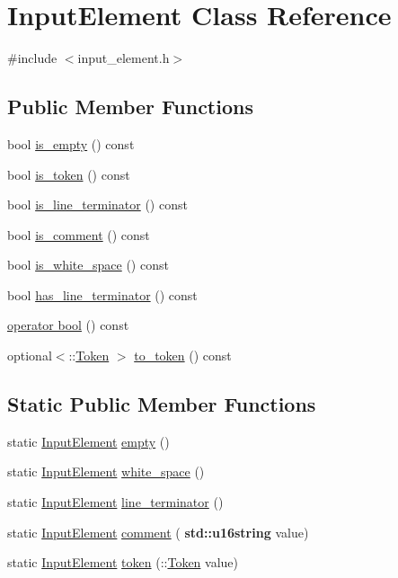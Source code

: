 \hypertarget{class_input_element}{}\section{Input\+Element Class Reference}
\label{class_input_element}


{\ttfamily \#include $<$input\+\_\+element.\+h$>$}

\subsection*{Public Member Functions}
\begin{DoxyCompactItemize}
\item 
bool \hyperlink{class_input_element_a4e4b6b2005fe0b8d07f30ef27210a51b}{is\+\_\+empty} () const
\item 
bool \hyperlink{class_input_element_a6bac1905f5d9aa43f89e1bbfdb553c15}{is\+\_\+token} () const
\item 
bool \hyperlink{class_input_element_adef5e449a8107adaac4f570994d698b9}{is\+\_\+line\+\_\+terminator} () const
\item 
bool \hyperlink{class_input_element_a1e2afc5eda150e298c2341e80798fddd}{is\+\_\+comment} () const
\item 
bool \hyperlink{class_input_element_af9fdf1da0079e858a7a6ad0b5e68d2be}{is\+\_\+white\+\_\+space} () const
\item 
bool \hyperlink{class_input_element_aba40c84ff7da5ede181b2109778fb02c}{has\+\_\+line\+\_\+terminator} () const
\item 
\hyperlink{class_input_element_af7bde3d94430ad92b13ffc395e36bb05}{operator bool} () const
\item 
optional$<$\+::\hyperlink{class_token}{Token} $>$ \hyperlink{class_input_element_af042668baf6daacc5cfdc4d488ca2bbc}{to\+\_\+token} () const
\end{DoxyCompactItemize}
\subsection*{Static Public Member Functions}
\begin{DoxyCompactItemize}
\item 
static \hyperlink{class_input_element}{Input\+Element} \hyperlink{class_input_element_aa6f769b2be5ea1b25e5cdb37235e23c9}{empty} ()
\item 
static \hyperlink{class_input_element}{Input\+Element} \hyperlink{class_input_element_a06304c0e0c45b213946409300d3fa29b}{white\+\_\+space} ()
\item 
static \hyperlink{class_input_element}{Input\+Element} \hyperlink{class_input_element_ae640c23f2603ce464f32bd57c5595656}{line\+\_\+terminator} ()
\item 
static \hyperlink{class_input_element}{Input\+Element} \hyperlink{class_input_element_a8a42a85aa10d7f3b40ea662402880a5a}{comment} (\textbf{ std\+::u16string} value)
\item 
static \hyperlink{class_input_element}{Input\+Element} \hyperlink{class_input_element_a6ecb5790fd45cd8f8492fa8b4011b817}{token} (\+::\hyperlink{class_token}{Token} value)
\end{DoxyCompactItemize}



